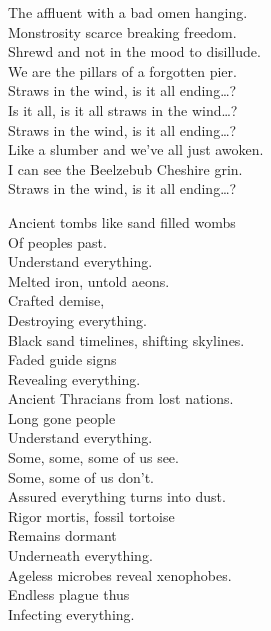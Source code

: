 The affluent with a bad omen hanging. \\
Monstrosity scarce breaking freedom. \\
Shrewd and not in the mood to disillude. \\
We are the pillars of a forgotten pier. \\

Straws in the wind, is it all ending…? \\

Is it all, is it all straws in the wind…? \\

Straws in the wind, is it all ending…? \\

Like a slumber and we've all just awoken. \\
I can see the Beelzebub Cheshire grin. \\

Straws in the wind, is it all ending…? \\






Ancient tombs like sand filled wombs \\
Of peoples  past. \\
Understand everything. \\
Melted iron, untold aeons. \\
Crafted demise, \\
Destroying everything. \\

Black sand timelines, shifting skylines. \\
Faded guide signs \\
Revealing everything. \\
Ancient Thracians from lost nations. \\
Long gone people \\
Understand everything. \\

Some, some, some of us see. \\
Some, some of us don't. \\
Assured everything turns into dust. \\

Rigor mortis, fossil tortoise \\
Remains dormant \\
Underneath everything. \\
Ageless microbes reveal xenophobes. \\
Endless plague thus \\
Infecting everything. \\

